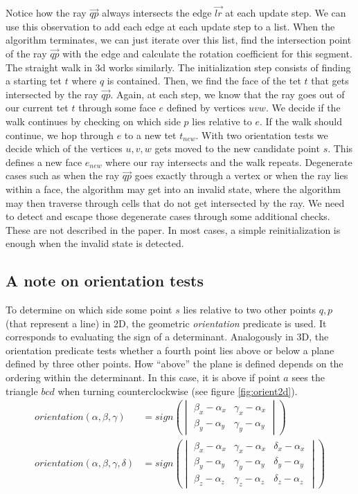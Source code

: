 \documentclass[../thesis.tex]{subfiles}
\begin{document}
Notice how the ray $\vec{qp}$ always intersects the edge $\vec{lr}$ at each update step.
We can use this observation to add each edge at each update step to a list.
When the algorithm terminates, we can just iterate over this list, find
the intersection point of the ray $\vec{qp}$ with the edge and calculate the rotation
coefficient for this segment.
The straight walk in 3d works similarly. The initialization step consists of finding a starting tet $t$
where $q$ is contained. Then, we find the face of the tet $t$ that gets intersected by the ray
$\vec{qp}$. Again, at each step, we know that the ray goes out of our current tet $t$ through some
face $e$ defined by vertices $uvw$. We decide if the walk continues by checking on which side $p$ lies relative to $e$.
If the walk should continue, we hop through $e$ to a new tet $t_{new}$. With two orientation tests
we decide which of the vertices $u, v, w$ gets moved to the new candidate point $s$. This defines
a new face $e_{new}$ where our ray intersects and the walk repeats.
Degenerate cases such as when the ray $\vec{qp}$ goes exactly through a vertex or
when the ray lies within a face, the algorithm may get into
an invalid state, where the algorithm may then traverse through
cells that do not get intersected by the ray. We need to detect and escape those degenerate cases
through some additional checks. These are not described in the paper\cite{Devillers}.
In most cases, a simple reinitialization is enough when the invalid state is detected.

\subsection{A note on orientation tests}
To determine on which side some point $s$ lies relative to two other points $q,p$ (that represent a line) in 2D, the geometric \emph{orientation} predicate is used.
It corresponds to evaluating the sign of a determinant. Analogously in 3D, the orientation predicate
tests whether a fourth point lies above or below a plane defined by three other points.
How ``above'' the plane is defined depends on the ordering within the determinant. In this case,
it is above if point $a$ sees the triangle $bcd$ when turning counterclockwise (see figure \ref{fig:orient2d}).
\begin{align*}
  orientation(\alpha, \beta, \gamma) &= 
  sign\left(
  \begin{vmatrix}
    \beta_x -\alpha_x & \gamma_x - \alpha_x \\
    \beta_y -\alpha_y & \gamma_y - \alpha_y 
  \end{vmatrix}\right)
  \\
  orientation(\alpha, \beta, \gamma, \delta) &= 
  sign\left(
  \begin{vmatrix}
    \beta_x -\alpha_x & \gamma_x - \alpha_x & \delta_x - \alpha_x \\
    \beta_y -\alpha_y & \gamma_y - \alpha_y & \delta_y - \alpha_y \\
    \beta_z -\alpha_z & \gamma_z - \alpha_z & \delta_z - \alpha_z
  \end{vmatrix}\right)
\end{align*}
\end{document}
